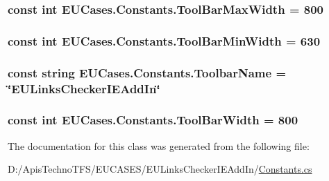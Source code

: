 \hypertarget{class_e_u_cases_1_1_constants_a798f400e8de0d31efeb32760c6919f8f}{
\subsubsection[{Tool\+Bar\+Max\+Width}]{\setlength{\rightskip}{0pt plus 5cm}const int E\+U\+Cases.\+Constants.\+Tool\+Bar\+Max\+Width = 800}}\label{class_e_u_cases_1_1_constants_a798f400e8de0d31efeb32760c6919f8f}
\hypertarget{class_e_u_cases_1_1_constants_a890854b577bb94dc5fee9ae0026478ea}{
\subsubsection[{Tool\+Bar\+Min\+Width}]{\setlength{\rightskip}{0pt plus 5cm}const int E\+U\+Cases.\+Constants.\+Tool\+Bar\+Min\+Width = 630}}\label{class_e_u_cases_1_1_constants_a890854b577bb94dc5fee9ae0026478ea}
\hypertarget{class_e_u_cases_1_1_constants_af27bcb7d9455c17ad60b337e3649d7e2}{
\subsubsection[{Toolbar\+Name}]{\setlength{\rightskip}{0pt plus 5cm}const string E\+U\+Cases.\+Constants.\+Toolbar\+Name = \char`\"{}E\+U\+Links\+Checker\+I\+E\+Add\+In\char`\"{}}}\label{class_e_u_cases_1_1_constants_af27bcb7d9455c17ad60b337e3649d7e2}
\hypertarget{class_e_u_cases_1_1_constants_acda8b45209ecc2b689fec9da7181595e}{
\subsubsection[{Tool\+Bar\+Width}]{\setlength{\rightskip}{0pt plus 5cm}const int E\+U\+Cases.\+Constants.\+Tool\+Bar\+Width = 800}}\label{class_e_u_cases_1_1_constants_acda8b45209ecc2b689fec9da7181595e}


The documentation for this class was generated from the following file\+:\begin{DoxyCompactItemize}
\item 
D\+:/\+Apis\+Techno\+T\+F\+S/\+E\+U\+C\+A\+S\+E\+S/\+E\+U\+Links\+Checker\+I\+E\+Add\+In/\hyperlink{_constants_8cs}{Constants.\+cs}\end{DoxyCompactItemize}
